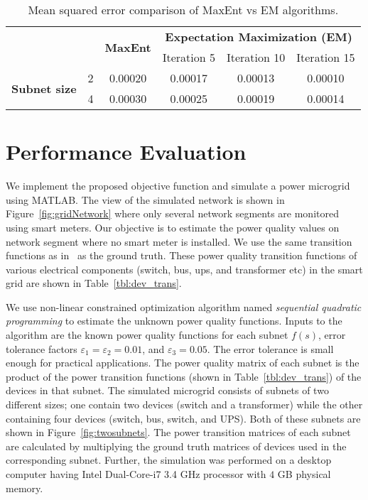 \begin{table}[!p]
\renewcommand{\tabcolsep}{0.2 cm}
\renewcommand*{\arraystretch}{2}
\centering \caption{Mean squared error comparison of MaxEnt vs EM algorithms.}
\begin{tabular}{|c|c|c|c|c|c|}
 \hline \multicolumn{2}{|c|}{\multirow{2}{*}{}} & \multirow{2}{*}{\textbf{MaxEnt}} & \multicolumn{3}{c|}{\textbf{Expectation Maximization (EM)}}\\
\cline{4-6}
\multicolumn{2}{|c|}{} & & Iteration 5 & Iteration 10 & Iteration 15\\
\hline
\multirow{2}{*}{\textbf{Subnet size}} & 2 & 0.00020 & 0.00017 & 0.00013 & 0.00010\\
\cline{2-6}
& 4 & 0.00030 & 0.00025 & 0.00019 & 0.00014\\
\hline
\end{tabular}
\vspace{4cm}
\label{tbl:eval_mse}
\end{table}

\section{Performance Evaluation}
\label{sec:evaluation}
We implement the proposed objective function and simulate a power microgrid using MATLAB. The view of the simulated network is shown in Figure~\ref{fig:gridNetwork} where only several network segments are monitored using smart meters. Our objective is to estimate the power quality values on network segment where no smart meter is installed. We use the same transition functions as in~\cite{catherine_pri} as the ground truth. These power quality transition functions of various electrical components (switch, bus, ups, and transformer etc) in the smart grid are shown in Table~\ref{tbl:dev_trans}.

We use non-linear constrained optimization algorithm named \textit{sequential quadratic programming} to estimate the unknown power quality functions. Inputs to the algorithm are the known power quality functions for each subnet $f(s)$, error tolerance factors $\varepsilon_1 = \varepsilon_2 = 0.01$, and $ \varepsilon_3 = 0.05$. The error tolerance is small enough for practical applications. The power quality matrix of each subnet is the product of the power transition functions (shown in Table~\ref{tbl:dev_trans}) of the devices in that subnet. The simulated microgrid consists of subnets of two different sizes; one contain two devices (switch and a transformer) while the other containing four devices (switch, bus, switch, and UPS). Both of these subnets are shown in Figure~\ref{fig:twosubnets}. The power transition matrices of each subnet are calculated by multiplying the ground truth matrices of devices used in the corresponding subnet. Further, the simulation was performed on a desktop computer having Intel Dual-Core-i7 3.4 GHz processor with $4$ GB physical memory.

